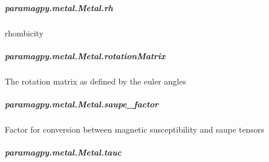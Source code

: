 \documentclass[a4paper,10pt,english]{sphinxmanual}
\begin{document}
\begin{fulllineitems}
\begin{fulllineitems}
\subparagraph{paramagpy.metal.Metal.rh}
\label{\detokenize{reference/generated/paramagpy.metal.Metal.rh:paramagpy-metal-metal-rh}}\label{\detokenize{reference/generated/paramagpy.metal.Metal.rh::doc}}

\begin{fulllineitems}
\label{\detokenize{reference/generated/paramagpy.metal.Metal.rh:paramagpy.metal.Metal.rh}}
rhombicity

\end{fulllineitems}



\subparagraph{paramagpy.metal.Metal.rotationMatrix}
\label{\detokenize{reference/generated/paramagpy.metal.Metal.rotationMatrix:paramagpy-metal-metal-rotationmatrix}}\label{\detokenize{reference/generated/paramagpy.metal.Metal.rotationMatrix::doc}}

\begin{fulllineitems}
\label{\detokenize{reference/generated/paramagpy.metal.Metal.rotationMatrix:paramagpy.metal.Metal.rotationMatrix}}
The rotation matrix as defined by the euler angles

\end{fulllineitems}



\subparagraph{paramagpy.metal.Metal.saupe\_factor}
\label{\detokenize{reference/generated/paramagpy.metal.Metal.saupe_factor:paramagpy-metal-metal-saupe-factor}}\label{\detokenize{reference/generated/paramagpy.metal.Metal.saupe_factor::doc}}

\begin{fulllineitems}
\label{\detokenize{reference/generated/paramagpy.metal.Metal.saupe_factor:paramagpy.metal.Metal.saupe_factor}}
Factor for conversion between magnetic susceptibility
and saupe tensors

\end{fulllineitems}



\subparagraph{paramagpy.metal.Metal.tauc}
\label{\detokenize{reference/generated/paramagpy.metal.Metal.tauc:paramagpy-metal-metal-tauc}}\label{\detokenize{reference/generated/paramagpy.metal.Metal.tauc::doc}}


\end{fulllineitems}
\end{fulllineitems}
\end{document}
